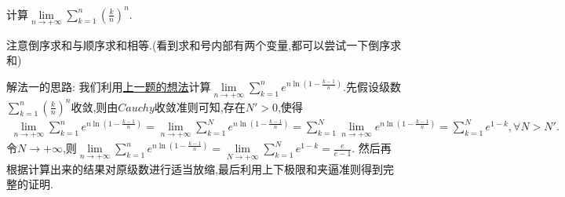 \documentclass[../../main.tex]{subfiles}
\begin{document}
\begin{example}
计算$\underset{n\rightarrow +\infty}{\lim}\sum\limits_{k=1}^n{\left( \frac{k}{n} \right) ^n}$.
\end{example}
\begin{remark}
注意倒序求和与顺序求和相等.(看到求和号内部有两个变量,都可以尝试一下倒序求和)
\end{remark}
\begin{note}
{\color{blue}解法一}的思路:
我们利用\hyperref[计算二元数列求和的极限的思路]{上一题的想法}计算$\underset{n\rightarrow +\infty}{\lim}\sum\limits_{k=1}^n{e^{n\ln \left( 1-\frac{k-1}{n} \right)}}$.先假设级数$\sum\limits_{k=1}^n{\left( \frac{k}{n} \right) ^n}$收敛,则由$Cauchy$收敛准则可知,存在$N'>0$,使得
\begin{align*}
\underset{n\rightarrow +\infty}{\lim}\sum\limits_{k=1}^n{e^{n\ln \left( 1-\frac{k-1}{n} \right)}}=\underset{n\rightarrow +\infty}{\lim}\sum\limits_{k=1}^N{e^{n\ln \left( 1-\frac{k-1}{n} \right)}}=\sum\limits_{k=1}^N{\underset{n\rightarrow +\infty}{\lim}e^{n\ln \left( 1-\frac{k-1}{n} \right)}=\sum\limits_{k=1}^N{e^{1-k}},\forall N>N'}.
\end{align*}
令$N\to +\infty$,则$\underset{n\rightarrow +\infty}{\lim}\sum\limits_{k=1}^n{e^{n\ln \left( 1-\frac{k-1}{n} \right)}}=\underset{N\rightarrow +\infty}{\lim}\sum\limits_{k=1}^N{e^{1-k}}=\frac{e}{e-1}$.
然后再根据计算出来的结果对原级数进行适当放缩,最后利用上下极限和夹逼准则得到完整的证明.
\end{note}
\end{document}
